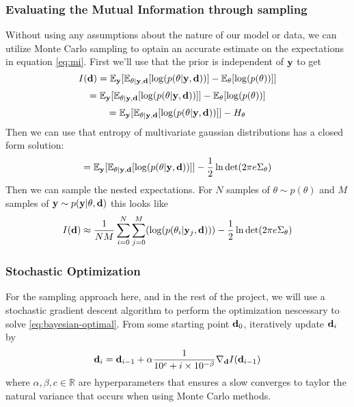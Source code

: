 \subsubsection{Evaluating the Mutual Information through sampling}
Without using any assumptions about the nature of our model or data, we can utilize Monte Carlo sampling to optain an accurate estimate on the expectations in equation \ref{eq:mi}.
First we'll use that the prior is independent of $\mathbf{y}$ to get
\begin{equation}
  I(\mathbf{d})  = \mathbb{E}_{\mathbf{y}}[\mathbb{E}_{\theta | \mathbf{y}, \mathbf{d}} [\log(p(\theta | \mathbf{y}, \mathbf{d}))] - \mathbb{E}_{\theta}[\log(p(\theta))]]
\end{equation}
\begin{equation}
  = \mathbb{E}_{\mathbf{y}}[\mathbb{E}_{\theta | \mathbf{y}, \mathbf{d}} [\log(p(\theta | \mathbf{y}, \mathbf{d}))]] - \mathbb{E}_{\theta}[\log(p(\theta))]
\end{equation}
\begin{equation}
  = \mathbb{E}_{\mathbf{y}}[\mathbb{E}_{\theta | \mathbf{y}, \mathbf{d}} [\log(p(\theta | \mathbf{y}, \mathbf{d}))]] - H_\theta
\end{equation}
Then we can use that entropy of multivariate gaussian distributions has a closed form solution:
\begin{equation}
  = \mathbb{E}_{\mathbf{y}}[\mathbb{E}_{\theta | \mathbf{y}, \mathbf{d}} [\log(p(\theta | \mathbf{y}, \mathbf{d}))]] - \frac{1}{2}\ln \det (2\pi e\Sigma_\theta)
\end{equation}
Then we can sample the nested expectations. For $N$ samples of $\theta \sim p(\theta)$ and $M$ samples of $\mathbf{y} \sim p(\mathbf{y} | \theta, \mathbf{d})$ this looks like
\begin{equation}
  I(\mathbf{d}) \approx \frac{1}{NM}\sum_{i=0}^N\sum_{j=0}^M(\log (p(\theta_i | \mathbf{y}_j, \mathbf{d}))) - \frac{1}{2}\ln \det (2\pi e\Sigma_\theta)
\end{equation}

\subsubsection{Stochastic Optimization}
For the sampling approach here, and in the rest of the project, we will use a stochastic gradient descent algorithm to perform the optimization nescessary to solve \ref{eq:bayesian-optimal}.
From some starting point $\mathbf{d}_0$, iteratively update $\mathbf{d}_i$ by
\begin{equation}
  \mathbf{d}_i = \mathbf{d}_{i-1} + \alpha \frac{1}{10^c + i \times 10^{-\beta}} \nabla_{\mathbf{d}} I(\mathbf{d}_{i-1})
\end{equation}
where $\alpha, \beta, c \in \mathbb{R}$ are hyperparameters that ensures a slow converges to taylor the natural variance that occurs when using Monte Carlo methods.

